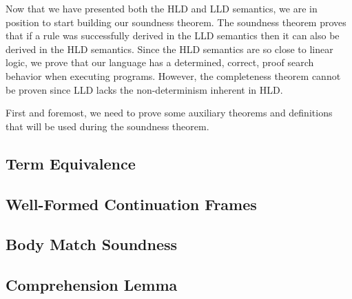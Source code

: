 
Now that we have presented both the HLD and LLD semantics, we are in position to start building our soundness theorem.
The soundness theorem proves that if a rule was successfully derived in the LLD semantics then it can also be derived
in the HLD semantics. Since the HLD semantics are so close to linear logic, we prove that our language has a determined, correct,
proof search behavior when executing programs. However, the completeness theorem cannot be proven since LLD lacks the non-determinism
inherent in HLD.


First and foremost, we need to prove some auxiliary theorems and definitions that will be used during the soundness theorem.

\subsection{Term Equivalence}


\subsection{Well-Formed Continuation Frames}


\subsection{Body Match Soundness}


\subsection{Comprehension Lemma}
